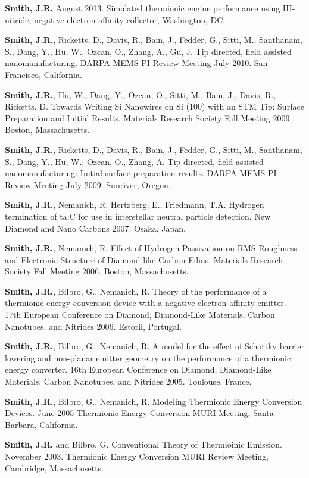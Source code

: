 \textbf{Smith, J.R.} August 2013. Simulated thermionic engine
performance using III-nitride, negative electron affinity collector,
Washington, DC.

\textbf{Smith, J.R.}, Ricketts, D., Davis, R., Bain, J., Fedder, G.,
Sitti, M., Santhanam, S., Dang, Y., Hu, W., Ozcan, O., Zhang, A., Gu, J.
Tip directed, field assisted nanomanufacturing. DARPA MEMS PI Review
Meeting July 2010. San Francisco, California.

\textbf{Smith, J.R.}, Hu, W., Dang, Y., Ozcan, O., Sitti, M., Bain, J.,
Davis, R., Ricketts, D. Towards Writing Si Nanowires on Si (100) with an
STM Tip: Surface Preparation and Initial Results. Materials Research
Society Fall Meeting 2009. Boston, Massachusetts.

\textbf{Smith, J.R.}, Ricketts, D., Davis, R., Bain, J., Fedder, G.,
Sitti, M., Santhanam, S., Dang, Y., Hu, W., Ozcan, O., Zhang, A. Tip
directed, field assisted nanomanufacturing: Initial surface preparation
results. DARPA MEMS PI Review Meeting July 2009. Sunriver, Oregon.

\textbf{Smith, J.R.}, Nemanich, R. Hertzberg, E., Friedmann, T.A.
Hydrogen termination of ta:C for use in interstellar neutral particle
detection. New Diamond and Nano Carbons 2007. Osaka, Japan.

\textbf{Smith, J.R.}, Nemanich, R. Effect of Hydrogen Passivation on RMS
Roughness and Electronic Structure of Diamond-like Carbon Films.
Materials Research Society Fall Meeting 2006. Boston, Massachusetts.

\textbf{Smith, J.R.}, Bilbro, G., Nemanich, R. Theory of the performance
of a thermionic energy conversion device with a negative electron
affinity emitter. 17th European Conference on Diamond, Diamond-Like
Materials, Carbon Nanotubes, and Nitrides 2006. Estoril, Portugal.

\textbf{Smith, J.R.}, Bilbro, G., Nemanich, R. A model for the effect of
Schottky barrier lowering and non-planar emitter geometry on the
performance of a thermionic energy converter. 16th European Conference
on Diamond, Diamond-Like Materials, Carbon Nanotubes, and Nitrides 2005.
Toulouse, France.

\textbf{Smith, J.R.}, Bilbro, G., Nemanich, R. Modeling Thermionic
Energy Conversion Devices. June 2005 Thermionic Energy Conversion MURI
Meeting, Santa Barbara, California.

\textbf{Smith, J.R.} and Bilbro, G. Conventional Theory of Thermioinic
Emission. November 2003. Thermionic Energy Conversion MURI Review
Meeting, Cambridge, Massachusetts.
